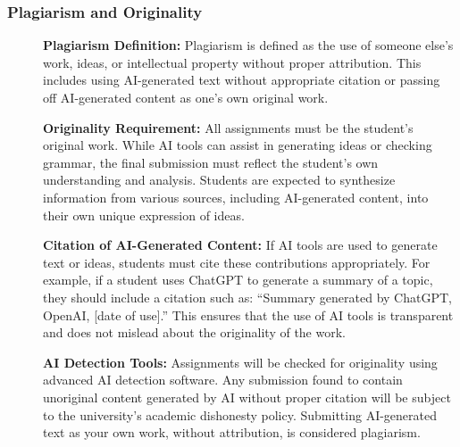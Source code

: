 \documentclass[11pt, letterpaper]{article}
\begin{document}
\subsubsection*{Plagiarism and Originality}
\begin{description}
    \item[] \textbf{Plagiarism Definition:} Plagiarism is defined as the use of someone else's work, ideas, or intellectual property without proper attribution. This includes using AI-generated text without appropriate citation or passing off AI-generated content as one's own original work.
    \item[] \textbf{Originality Requirement:} All assignments must be the student's original work. While AI tools can assist in generating ideas or checking grammar, the final submission must reflect the student's own understanding and analysis. Students are expected to synthesize information from various sources, including AI-generated content, into their own unique expression of ideas.
    \item[] \textbf{Citation of AI-Generated Content:} If AI tools are used to generate text or ideas, students must cite these contributions appropriately. For example, if a student uses ChatGPT to generate a summary of a topic, they should include a citation such as: ``Summary generated by ChatGPT, OpenAI, [date of use].'' This ensures that the use of AI tools is transparent and does not mislead about the originality of the work.
    \item[] \textbf{AI Detection Tools:} Assignments will be checked for originality using advanced AI detection software. Any submission found to contain unoriginal content generated by AI without proper citation will be subject to the university's academic dishonesty policy. Submitting AI-generated text as your own work, without attribution, is considered plagiarism.
\end{description}
\end{document}
